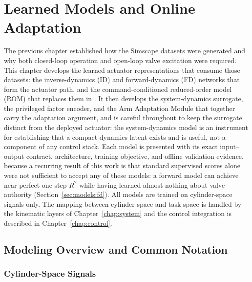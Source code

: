 \chapter{Learned Models and Online Adaptation}
\label{chap:models}

The previous chapter established how the Simscape datasets were generated and
why both closed-loop operation and open-loop valve excitation were required.
This chapter develops the learned actuator representations that consume those
datasets: the inverse-dynamics (ID) and forward-dynamics (FD) networks that
form the \ppoIDFD{} actuator path, and the command-conditioned reduced-order
model (ROM) that replaces them in \ppoROM. It then develops the
system-dynamics surrogate, the privileged factor encoder, and the Arm
Adaptation Module that together carry the adaptation argument, and is careful
throughout to keep the surrogate distinct from the deployed actuator: the
system-dynamics model is an instrument for establishing that a compact
dynamics latent exists and is useful, not a component of any control stack.
Each model is presented with its
exact input--output contract, architecture, training objective, and offline
validation evidence, because a recurring result of this work is that standard
supervised scores alone were not sufficient to accept any of these models: a
forward model can achieve near-perfect one-step $R^2$ while having learned
almost nothing about valve authority
(Section~\ref{sec:models:fd}). All models are trained on cylinder-space
signals only. The mapping between cylinder space and task space is handled by
the kinematic layers of Chapter~\ref{chap:system} and the control integration
is described in Chapter~\ref{chap:control}.

\section{Modeling Overview and Common Notation}
\label{sec:models:overview}

\subsection{Cylinder-Space Signals}

